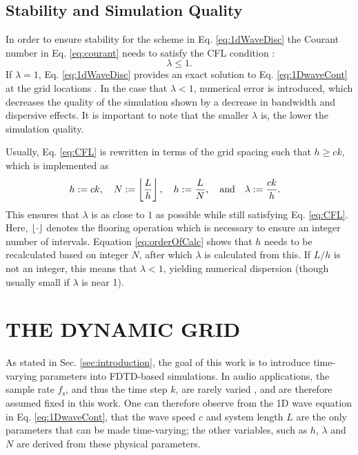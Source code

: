 \documentclass[fleqn]{jaes}
\begin{document}
\subsection{Stability and Simulation Quality}\label{sec:quality}
In order to ensure stability for the scheme in Eq. \eqref{eq:1dWaveDisc} the Courant number in Eq. \eqref{eq:courant} needs to satisfy the CFL condition \cite{Courant1928}:
\begin{equation}\label{eq:CFL}
    \lambda \leq 1.
\end{equation}
%
If $\lambda = 1$, Eq. \eqref{eq:1dWaveDisc} provides an exact solution to Eq. \eqref{eq:1DwaveCont} at the grid locations \cite{Bilbao2009}. In the case that $\lambda < 1$, numerical error is introduced, which decreases the quality of the simulation shown by a decrease in bandwidth and dispersive effects. It is important to note that the smaller $\lambda$ is, the lower the simulation quality.

Usually, Eq. \eqref{eq:CFL} is rewritten in terms of the grid spacing such that $h \geq c k$,
which is implemented as
\begin{equation}\label{eq:orderOfCalc}
    \!\!\!\!\!h:=ck, \quad N := \floor[\frac{L}{h}],\quad h := \frac{L}{N},\qaq \lambda := \frac{ck}{h}.
\end{equation}
This ensures that $\lambda$ is as close to $1$ as possible while still satisfying Eq. \eqref{eq:CFL}. Here, $\floor[\cdot]$ denotes the flooring operation which is necessary to ensure an integer number of intervals. Equation \eqref{eq:orderOfCalc} shows that $h$ needs to be recalculated based on integer $N$, after which $\lambda$ is calculated from this. If $L/h$ is not an integer, this means that $\lambda < 1$, yielding numerical dispersion (though usually small if $\lambda$ is near 1).

\section{THE DYNAMIC GRID}\label{sec:dynamicGrid}
As stated in Sec. \ref{sec:introduction}, the goal of this work is to introduce time-varying parameters into FDTD-based simulations. In audio applications, the sample rate $f_\text{s}$, and thus the time step $k$, are rarely varied \cite{Bilbao2009}, and are therefore assumed fixed in this work. One can therefore observe from the 1D wave equation in Eq. \eqref{eq:1DwaveCont}, that the wave speed $c$ and system length $L$ are the only parameters that can be made time-varying; the other variables, such as $h$, $\lambda$ and $N$ are derived from these physical parameters. 
\end{document}
